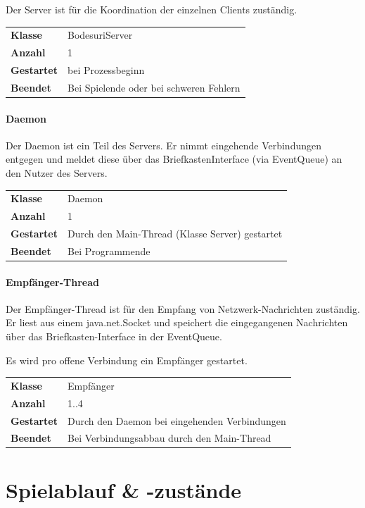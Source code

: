 \documentclass[12pt,halfparskip]{scrartcl}
\begin{document}
Der Server ist für die Koordination der einzelnen Clients zuständig.

\begin{tabular}{@{} l p{12.5cm}}
\textbf{Klasse}       & BodesuriServer \\
\textbf{Anzahl}       & 1 \\
\textbf{Gestartet}    & bei Prozessbeginn \\
\textbf{Beendet}      & Bei Spielende oder bei schweren Fehlern
\end{tabular}

\paragraph{Daemon}
\label{ssub:daemon}

Der Daemon ist ein Teil des Servers. Er nimmt eingehende Verbindungen entgegen und meldet diese über das BriefkastenInterface (via EventQueue) an den Nutzer des Servers.

\begin{tabular}{@{} l p{12.5cm}}
\textbf{Klasse}       & Daemon \\
\textbf{Anzahl}       & 1 \\
\textbf{Gestartet}    & Durch den Main-Thread (Klasse Server) gestartet \\
\textbf{Beendet}      & Bei Programmende
\end{tabular}

\paragraph{Empfänger-Thread}

Der Empfänger-Thread ist für den Empfang von Netzwerk-Nachrichten zuständig. Er liest aus einem java.net.Socket und speichert die eingegangenen Nachrichten über das Briefkasten-Interface in der EventQueue.

Es wird pro offene Verbindung ein Empfänger gestartet.

\begin{tabular}{@{} l p{12.5cm}}
\textbf{Klasse}       & Empfänger \\
\textbf{Anzahl}       & 1..4 \\
\textbf{Gestartet}    & Durch den Daemon bei eingehenden Verbindungen  \\
\textbf{Beendet}      & Bei Verbindungsabbau durch den Main-Thread
\end{tabular}

\clearpage
\section{Spielablauf \& -zustände}
\label{spielzustaende_nachrichten}
\end{document}
